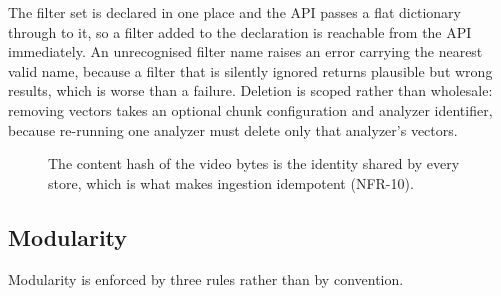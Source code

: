 \documentclass[11pt,a4paper]{article}
\begin{document}
The filter set is declared in one place and the API passes a flat dictionary
through to it, so a filter added to the declaration is reachable from the API
immediately. An unrecognised filter name raises an error carrying the nearest
valid name, because a filter that is silently ignored returns plausible but
wrong results, which is worse than a failure. Deletion is scoped rather than
wholesale: removing vectors takes an optional chunk configuration and analyzer
identifier, because re-running one analyzer must delete only that analyzer's
vectors.

\begin{figure}[htbp]
\centering
{}
\caption{The content hash of the video bytes is the identity shared by every
store, which is what makes ingestion idempotent (NFR-10).}
\label{fig:keys}
\end{figure}

\subsection{Modularity}

Modularity is enforced by three rules rather than by convention.
\end{document}
